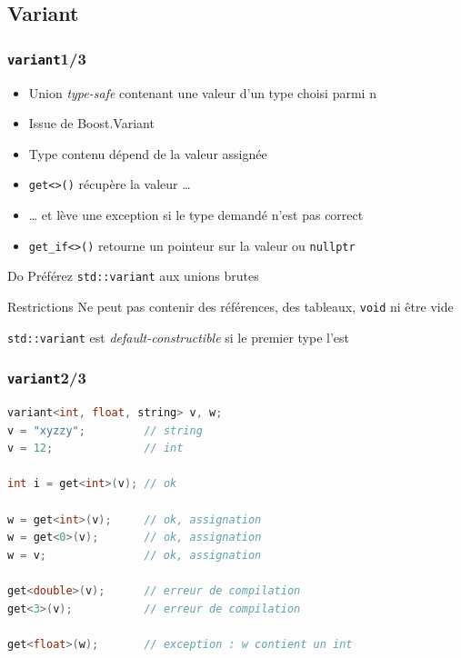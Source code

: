 \documentclass[C++.tex]{subfiles}
\begin{document}
\subsection*{Variant}
\begin{frame}[fragile]
	\frametitle{\lstinline|variant|\titlehfill{}1/3}
	\begin{itemize}
		\item Union \textit{type-safe} contenant une valeur d'un type choisi parmi n
		\item Issue de Boost.Variant
		\item Type contenu dépend de la valeur assignée
		\item \lstinline|get<>()| récupère la valeur \ldots
		\item \ldots{} et lève une exception si le type demandé n'est pas correct
		\item \lstinline|get_if<>()| retourne un pointeur sur la valeur ou \lstinline|nullptr|
	\end{itemize}

	\begin{exampleblock}{Do}
		Préférez \lstinline|std::variant| aux unions brutes
	\end{exampleblock}

	\begin{alertblock}{Restrictions}
		Ne peut pas contenir des références, des tableaux, \lstinline|void| ni être vide\\


		\lstinline|std::variant| est \textit{default-constructible} si le premier type l'est\\

	\end{alertblock}
\end{frame}

\begin{frame}[fragile]
	\frametitle{\lstinline|variant|\titlehfill{}2/3}
	\begin{lstlisting}[language=C++]
variant<int, float, string> v, w;
v = "xyzzy";         // string
v = 12;              // int

int i = get<int>(v); // ok

w = get<int>(v);     // ok, assignation
w = get<0>(v);       // ok, assignation
w = v;               // ok, assignation

get<double>(v);      // erreur de compilation
get<3>(v);           // erreur de compilation

get<float>(w);       // exception : w contient un int\end{lstlisting}
\end{frame}
\end{document}
